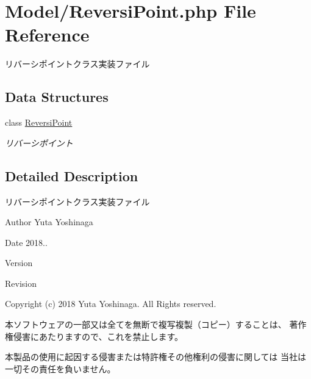\hypertarget{_reversi_point_8php}{}\section{Model/\+Reversi\+Point.php File Reference}
\label{_reversi_point_8php}


リバーシポイントクラス実装ファイル  


\subsection*{Data Structures}
\begin{DoxyCompactItemize}
\item 
class \hyperlink{class_reversi_point}{Reversi\+Point}
\begin{DoxyCompactList}\small\item\em リバーシポイント \end{DoxyCompactList}\end{DoxyCompactItemize}


\subsection{Detailed Description}
リバーシポイントクラス実装ファイル 

\begin{DoxyAuthor}{Author}
Yuta Yoshinaga 
\end{DoxyAuthor}
\begin{DoxyDate}{Date}
2018.. 
\end{DoxyDate}
\begin{DoxyParagraph}{Version}

\end{DoxyParagraph}
\begin{DoxyParagraph}{Revision}

\end{DoxyParagraph}


Copyright (c) 2018 Yuta Yoshinaga. All Rights reserved.


\begin{DoxyItemize}
\item 本ソフトウェアの一部又は全てを無断で複写複製（コピー）することは、 著作権侵害にあたりますので、これを禁止します。
\item 本製品の使用に起因する侵害または特許権その他権利の侵害に関しては 当社は一切その責任を負いません。 
\end{DoxyItemize}
